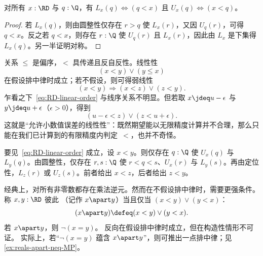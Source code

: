 \begin{lem} \label{dedekind-in-cut-as-le}
  对所有 $x : \RD$ 与 $q : \Q$，有 $L_x(q) \Leftrightarrow (q < x)$ 且 $U_x(q)
  \Leftrightarrow (x < q)$。
\end{lem}

\begin{proof}
  若 $L_x(q)$，则由圆整性仅存在 $r > q$ 使 $L_x(r)$，又因 $U_q(r)$，可得 $q < x$。反之若 $q < x$，则存在 $r : \Q$ 使 $U_q(r)$ 且 $L_x(r)$，因此由 $L_x$ 是下集得 $L_x(q)$。另一半证明对称。
\end{proof}

%
关系 $\leq$ 是偏序，$<$ 具传递且反自反性。线性性
%
%
%
\begin{equation*}
  (x < y) \lor (y \leq x)
\end{equation*}
%
在假设排中律时成立；若不假设，则可得弱线性
%
\begin{equation} \label{eq:RD-linear-order}
  (x < y) \Rightarrow (x < z) \lor (z < y).
\end{equation}
%
乍看之下~\eqref{eq:RD-linear-order} 与线序关系不明显。但若取 $x \jdeq u - \epsilon$ 与 $y \jdeq u + \epsilon$（$\epsilon > 0$），得到
%
\begin{equation*}
  (u - \epsilon < z) \lor (z < u + \epsilon).
\end{equation*}
%
这就是“允许小数值误差的线性性”：既然期望能以无限精度计算并不合理，那么只能在我们已计算到的有限精度内判定~$<$，也并不奇怪。

要见~\eqref{eq:RD-linear-order} 成立，设 $x < y$。则仅存在 $q : \Q$ 使 $U_x(q)$ 与
$L_y(q)$。由圆整性，仅存在 $r, s : \Q$ 使 $r < q < s$、$U_x(r)$
与 $L_y(s)$。再由定位性，$L_z(r)$ 或 $U_z(s)$。前者给出 $x < z$，后者给出 $z < y$。

经典上，对所有非零数都存在乘法逆元。然而在不假设排中律时，需要更强条件。称 $x, y : \RD$
彼此
%
（记作 $x \apart y$）当且仅当 $(x < y) \lor (y < x)$：
%
\begin{equation*}
  (x \apart y) \defeq (x < y) \lor (y < x).
\end{equation*}
%
若 $x \apart y$，则 $\lnot (x = y)$。
反向在假设排中律时成立，但在构造性情形不可证。
%
实际上，若“$\lnot (x = y)$ 蕴含 $x\apart y$”，则可推出一点排中律；见 \cref{ex:reals-apart-neq-MP}。

